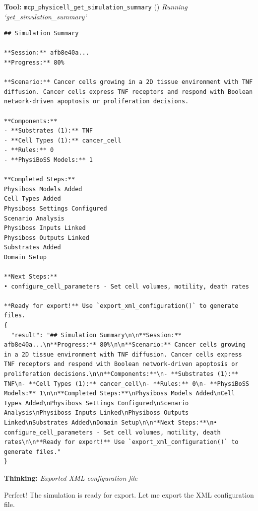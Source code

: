\documentclass[11pt,a4paper]{article}
\begin{document}
\begin{toolokbox}
\textbf{Tool:} \texttt{mcp\_physicell\_get\_simulation\_summary} (\checkmark)
\textit{Running `get\_simulation\_summary`}
\begin{lstlisting}
## Simulation Summary

**Session:** afb8e40a...
**Progress:** 80%

**Scenario:** Cancer cells growing in a 2D tissue environment with TNF diffusion. Cancer cells express TNF receptors and respond with Boolean network-driven apoptosis or proliferation decisions.

**Components:**
- **Substrates (1):** TNF
- **Cell Types (1):** cancer_cell
- **Rules:** 0
- **PhysiBoSS Models:** 1

**Completed Steps:**
Physiboss Models Added
Cell Types Added
Physiboss Settings Configured
Scenario Analysis
Physiboss Inputs Linked
Physiboss Outputs Linked
Substrates Added
Domain Setup

**Next Steps:**
• configure_cell_parameters - Set cell volumes, motility, death rates

**Ready for export!** Use `export_xml_configuration()` to generate files.
{
  "result": "## Simulation Summary\n\n**Session:** afb8e40a...\n**Progress:** 80%\n\n**Scenario:** Cancer cells growing in a 2D tissue environment with TNF diffusion. Cancer cells express TNF receptors and respond with Boolean network-driven apoptosis or proliferation decisions.\n\n**Components:**\n- **Substrates (1):** TNF\n- **Cell Types (1):** cancer_cell\n- **Rules:** 0\n- **PhysiBoSS Models:** 1\n\n**Completed Steps:**\nPhysiboss Models Added\nCell Types Added\nPhysiboss Settings Configured\nScenario Analysis\nPhysiboss Inputs Linked\nPhysiboss Outputs Linked\nSubstrates Added\nDomain Setup\n\n**Next Steps:**\n• configure_cell_parameters - Set cell volumes, motility, death rates\n\n**Ready for export!** Use `export_xml_configuration()` to generate files."
}
\end{lstlisting}
\end{toolokbox}
\begin{thinkbox}
\textbf{Thinking:} \textit{Exported XML configuration file}

Perfect! The simulation is ready for export. Let me export the XML configuration file.

\end{thinkbox}
\end{document}
